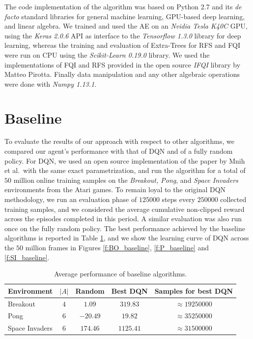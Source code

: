 The code implementation of the algorithm was based on Python 2.7 and its 
\textit{de facto} standard libraries for general machine learning, GPU-based 
deep learning, and linear algebra. 
We trained and used the AE on an \textit{Nvidia Tesla K40C} GPU, using the 
\textit{Keras 2.0.6} API as interface to the \textit{Tensorflow 1.3.0} library 
for deep learning, whereas the training and evaluation of Extra-Trees 
for RFS and FQI were run on CPU using the \textit{Scikit-Learn 0.19.0} library.
We used the implementations of FQI and RFS provided in the open source 
\textit{IFQI} library by Matteo Pirotta.
Finally data manipulation and any other algebraic operations were done with 
\textit{Numpy 1.13.1}.

\section{Baseline}\label{s:exp_baseline}
To evaluate the results of our approach with respect to other algorithms, we 
compared our agent's performance with that of DQN \cite{mnih2015human} and of a 
fully random policy. 
For DQN, we used an open source implementation of the paper by Mnih et al.\  
with the same exact parametrization, and run the algorithm for a total of $50$ 
million online training samples on the \textit{Breakout, Pong}, and 
\textit{Space Invaders} environments from the Atari games.
To remain loyal to the original DQN methodology, we run an evaluation phase 
of $125000$ steps every $250000$ collected training samples, and we considered
the average cumulative non-clipped reward across the episodes completed in
this period. A similar evaluation was also run once on the fully random policy.
The best performance achieved by the baseline algorithms is reported in Table 
\ref{t:envs_used}, and we show the learning curve of DQN across the $50$ million
frames in Figures \ref{f:BO_baseline}, \ref{f:P_baseline} and \ref{f:SI_baseline}.
%
\begin{table}[b]
    \centering
    \begin{tabular}{l c c c c} 
	\hline
	Environment    & $|A|$ & Random   & Best DQN  & Samples for best DQN \\ 
	\hline 
	Breakout       & $4$   & $1.09$   & $319.83$  & $\approx19250000$ \\
	Pong           & $6$   & $-20.49$ & $19.82$   & $\approx35250000$ \\
	Space Invaders & $6$   & $174.46$ & $1125.41$ & $\approx31500000$ \\
	\hline
    \end{tabular}
    \caption[Performance of baseline algorithms]{Average performance of baseline
	     algorithms.}
    \label{t:envs_used}
\end{table}
